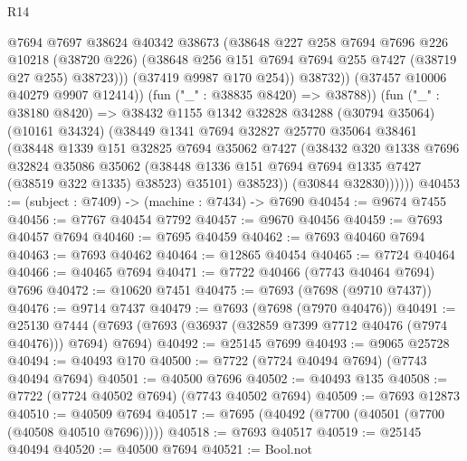 \begin{lexlean}{R14}
\begin{coremodule}
                        @7694
                        @7697
                        @38624
                        @40342
                        @38673
                        (@38648
                          @227
                          @258
                          @7694
                          @7696
                          @226
                          @10218
                          (@38720 @226)
                          (@38648 @256 @151 @7694 @7694 @255 @7427 (@38719 @27 @255) @38723)))
                      (@37419 @9987 @170 @254))
                    @38732))
                (@37457 @10006 @40279 @9907 @12414))
              (fun ("_" : @38835 @8420) => @38788))
            (fun ("_" : @38180 @8420) =>
            @38432
              @1155
              @1342
              @32828
              @34288
              (@30794 @35064)
              (@10161 @34324)
              (@38449
                @1341
                @7694
                @32827
                @25770
                @35064
                @38461
                (@38448
                  @1339
                  @151
                  @32825
                  @7694
                  @35062
                  @7427
                  (@38432
                    @320
                    @1338
                    @7696
                    @32824
                    @35086
                    @35062
                    (@38448 @1336 @151 @7694 @7694 @1335 @7427 (@38519 @322 @1335) @38523)
                    @35101)
                  @38523))
              (@30844 @32830))))))
@40453 := (subject : @7409) -> (machine : @7434) -> @7690
@40454 := @9674 @7455
@40456 := @7767 @40454 @7792
@40457 := @9670 @40456
@40459 := @7693 @40457 @7694
@40460 := @7695 @40459
@40462 := @7693 @40460 @7694
@40463 := @7693 @40462
@40464 := @12865 @40454
@40465 := @7724 @40464
@40466 := @40465 @7694
@40471 := @7722 @40466 (@7743 @40464 @7694) @7696
@40472 := @10620 @7451
@40475 := @7693 (@7698 (@9710 @7437))
@40476 := @9714 @7437
@40479 := @7693 (@7698 (@7970 @40476))
@40491 := @25130
    @7444
    (@7693 (@7693 (@36937 (@32859 @7399 @7712 @40476 (@7974 @40476))) @7694) @7694)
@40492 := @25145 @7699
@40493 := @9065 @25728
@40494 := @40493 @170
@40500 := @7722 (@7724 @40494 @7694) (@7743 @40494 @7694)
@40501 := @40500 @7696
@40502 := @40493 @135
@40508 := @7722 (@7724 @40502 @7694) (@7743 @40502 @7694)
@40509 := @7693 @12873
@40510 := @40509 @7694
@40517 := @7695 (@40492 (@7700 (@40501 (@7700 (@40508 @40510 @7696)))))
@40518 := @7693 @40517
@40519 := @25145 @40494
@40520 := @40500 @7694
@40521 := Bool.not

\end{coremodule}
\end{lexlean}
